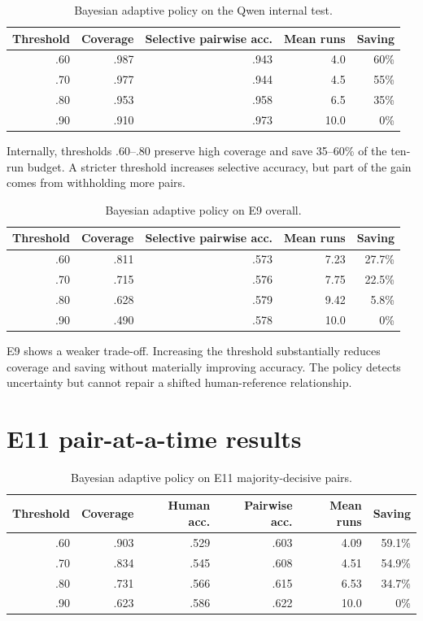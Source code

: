 \documentclass[11pt,twoside,a4paper]{report}
\begin{document}
\begin{table}[htbp]
\centering
\caption{Bayesian adaptive policy on the Qwen internal test.}
\label{tab:adaptive-internal}
\begin{tabular}{rrrrr}
\toprule
Threshold & Coverage & Selective pairwise acc. & Mean runs & Saving \\
\midrule
.60 & .987 & .943 & 4.0 & 60\% \\
.70 & .977 & .944 & 4.5 & 55\% \\
.80 & .953 & .958 & 6.5 & 35\% \\
.90 & .910 & .973 & 10.0 & 0\% \\
\bottomrule
\end{tabular}
\end{table}

Internally, thresholds .60--.80 preserve high coverage and save 35--60\% of the
ten-run budget.  A stricter threshold increases selective accuracy, but part of the
gain comes from withholding more pairs.

\begin{table}[htbp]
\centering
\caption{Bayesian adaptive policy on E9 overall.}
\label{tab:adaptive-e9}
\begin{tabular}{rrrrr}
\toprule
Threshold & Coverage & Selective pairwise acc. & Mean runs & Saving \\
\midrule
.60 & .811 & .573 & 7.23 & 27.7\% \\
.70 & .715 & .576 & 7.75 & 22.5\% \\
.80 & .628 & .579 & 9.42 & 5.8\% \\
.90 & .490 & .578 & 10.0 & 0\% \\
\bottomrule
\end{tabular}
\end{table}

E9 shows a weaker trade-off.  Increasing the threshold substantially reduces
coverage and saving without materially improving accuracy.  The policy detects
uncertainty but cannot repair a shifted human-reference relationship.

\section{E11 pair-at-a-time results}

\begin{table}[htbp]
\centering
\caption{Bayesian adaptive policy on E11 majority-decisive pairs.}
\label{tab:adaptive-e11}
\begin{tabular}{rrrrrr}
\toprule
Threshold & Coverage & Human acc. & Pairwise acc. & Mean runs & Saving \\
\midrule
.60 & .903 & .529 & .603 & 4.09 & 59.1\% \\
.70 & .834 & .545 & .608 & 4.51 & 54.9\% \\
.80 & .731 & .566 & .615 & 6.53 & 34.7\% \\
.90 & .623 & .586 & .622 & 10.0 & 0\% \\
\bottomrule
\end{tabular}
\end{table}
\end{document}
